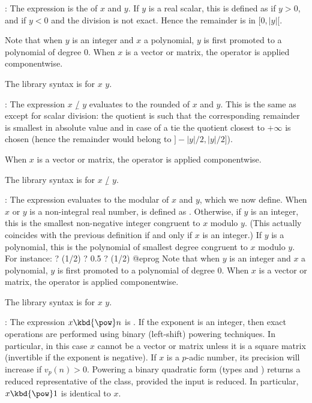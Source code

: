 \subseckbd{\bs}: The expression  is the  of $x$ and $y$. If $y$ is a real scalar, this is defined as
 if $y > 0$, and  if $y < 0$ and
the division is not exact. Hence the remainder 
is in $[0, |y|[$.

Note that when $y$ is an integer and $x$ a polynomial, $y$ is first promoted
to a polynomial of degree $0$. When $x$ is a vector or matrix, the operator
is applied componentwise.

The library syntax is 
for $x$ \kbd{\bs} $y$.

\subseckbd{\bs/}: The expression $x$ \b{/} $y$ evaluates to the rounded
 of $x$ and $y$. This is the same as 
except for scalar division: the quotient is such that the corresponding
remainder is smallest in absolute value and in case of a tie the quotient
closest to $+\infty$ is chosen (hence the remainder would belong to
$]{-}|y|/2, |y|/2]$).

When $x$ is a vector or matrix, the operator is applied componentwise.

The library syntax is 
for $x$ \b{/} $y$.

\subseckbd{\%}: The expression  evaluates to the modular
 of $x$ and $y$, which we now define. When $x$ or $y$
is a non-integral real number,  is defined as . Otherwise, if $y$ is an integer, this is the smallest
non-negative integer congruent to $x$ modulo $y$. (This actually coincides with
the previous definition if and only if $x$ is an integer.) If $y$ is a
polynomial, this is the polynomial of smallest degree congruent to $x$ modulo
$y$. For instance:
\bprog
? (1/2) %
? 0.5 %
? (1/2) %
@eprog
Note that when $y$ is an integer and $x$ a polynomial, $y$ is first promoted
to a polynomial of degree $0$. When $x$ is a vector or matrix, the operator
is applied componentwise.

The library syntax is 
for $x$ \kbd{\%} $y$.

\subseckbd{\pow}: The expression $x\hbox{\kbd{\pow}}n$ is .
If the exponent is an integer, then exact operations are performed using
binary (left-shift) powering techniques. In particular, in this case $x$
cannot be a vector or matrix unless it is a square matrix (invertible
if the exponent is negative). If $x$ is a $p$-adic number, its
precision will increase if $v_p(n) > 0$. Powering a binary quadratic form
(types  and ) returns a reduced representative of the
class, provided the input is reduced. In particular, $x\hbox{\kbd{\pow}}1$ is
identical to $x$.

